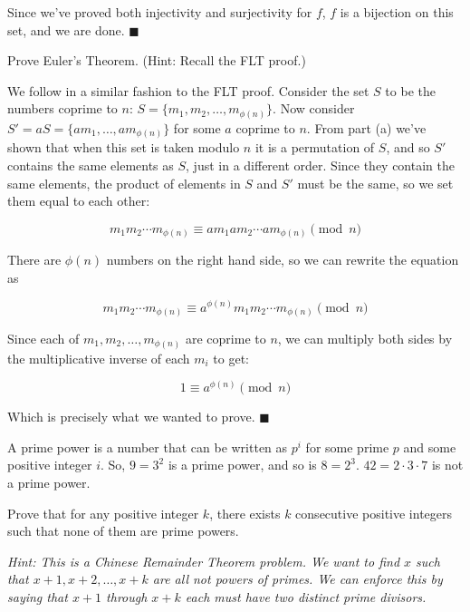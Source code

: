 \documentclass[11pt]{article}
\begin{document}
\begin{Parts}
\begin{solution}
    Since we've proved both injectivity and surjectivity for $f$, $f$ is a bijection on this set, and we are done. $\blacksquare$
  \end{solution}

  \Part Prove Euler's Theorem. (Hint: Recall the FLT proof.)

  \begin{solution}
    We follow in a similar fashion to the FLT proof. Consider the set $S$ to be the numbers coprime to $n$: $S = \{m_1, m_2, \dots, m_{\phi(n)}\}$. Now consider $S' = aS = \{am_1, \dots, am_{\phi(n)}\}$ for some $a$ coprime to $n$. From part (a) we've shown that when this set is taken modulo $n$ it is a permutation of $S$, and so $S'$ contains the same elements as $S$, just in a different order. Since they contain the same elements, the product of elements in $S$ and $S'$ must be the same, so we set them equal to each other: 

    \[ m_1m_2\cdots m_{\phi(n)} \equiv am_1am_2\cdots am_{\phi(n)} \pmod{n}\]

    There are $\phi(n)$ numbers on the right hand side, so we can rewrite the equation as
    
    \[ m_1m_2\cdots m_{\phi(n)} \equiv a^{\phi(n)}m_1m_2\cdots m_{\phi(n)} \pmod{n}\]
    
    Since each of $m_1, m_2, \dots, m_{\phi(n)}$ are coprime to $n$, we can multiply both sides by the multiplicative inverse of each $m_i$ to get:

    \[ 1 \equiv a^{\phi(n)} \pmod{n}\]
    
    Which is precisely what we wanted to prove. $\blacksquare$

    
  \end{solution}


\end{Parts}

\pagebreak
{}

A prime power is a number that can be written as $p^i$ for some prime $p$ and some
positive integer $i$. So, $9 = 3^2$ is a prime power, and so is $8 = 2^3$. $42 = 2 \cdot 3 \cdot 7$ is not
a prime power.

Prove that for any positive integer $k$, there exists $k$ consecutive positive integers
such that none of them are prime powers.

\emph{Hint: This is a Chinese Remainder Theorem problem. We want to find $x$ such that $x + 1, x + 2, \ldots, x+k$ are all not powers of primes. We can enforce this by saying that $x+1$ through $x+k$ each must have two distinct prime divisors.}
\end{document}
